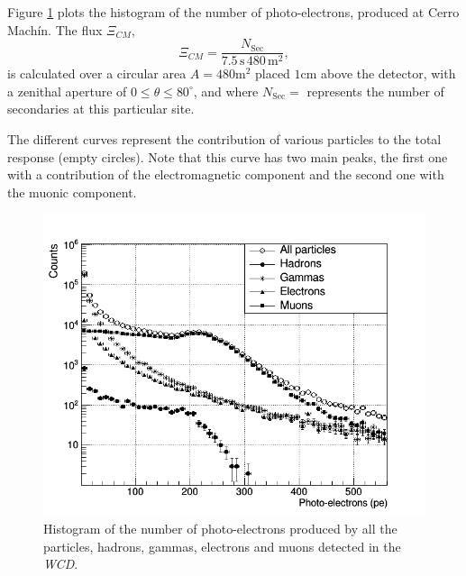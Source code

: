 \documentclass[submitting]{nst}
\begin{document}
Figure \ref{fig:flux} plots the histogram of the number of photo-electrons, produced at Cerro Machín. The flux $\Xi_{CM}$, 
\begin{equation}
\Xi_{CM} = \frac{N_{\mathrm{Sec}}}{7.5\,\mathrm{s}\, 480\,\mathrm{m}^2}, 
\end{equation}
is calculated over a circular area $A=480$m$^2$ placed $1$cm above the detector, with a zenithal aperture of $0\leq \theta \leq 80^{\circ}$, and where $N_{\mathrm{Sec}}=$ represents the number of secondaries at this particular site.

 The different curves represent the contribution of various particles to the total response (empty circles). Note that this curve has two main peaks, the first one with a contribution of the electromagnetic component and the second one with the muonic component.
\begin{figure}
    \centering
    \includegraphics[scale=0.4]{Figures/flux.png}
    \caption{Histogram of the number of photo-electrons produced by all the particles, hadrons, gammas, electrons and muons detected in the \textsl{WCD}.}
    \label{fig:flux}
\end{figure}


\end{document}
